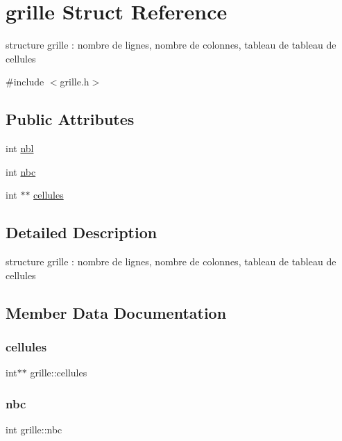 \hypertarget{structgrille}{}\section{grille Struct Reference}
\label{structgrille}


structure grille \+: nombre de lignes, nombre de colonnes, tableau de tableau de cellules  




{\ttfamily \#include $<$grille.\+h$>$}

\subsection*{Public Attributes}
\begin{DoxyCompactItemize}
\item 
int \hyperlink{structgrille_a0b4da1e205825df205b0c004d105d62a}{nbl}
\item 
int \hyperlink{structgrille_a48d6706d41bee6fff9200d872b8b0cd0}{nbc}
\item 
int $\ast$$\ast$ \hyperlink{structgrille_a428cf0c0297ce04e0206ba0067ac3b42}{cellules}
\end{DoxyCompactItemize}


\subsection{Detailed Description}
structure grille \+: nombre de lignes, nombre de colonnes, tableau de tableau de cellules 

\subsection{Member Data Documentation}
\mbox{\label{structgrille_a428cf0c0297ce04e0206ba0067ac3b42}} 
\subsubsection{\texorpdfstring{cellules}{cellules}}
{\footnotesize\ttfamily int$\ast$$\ast$ grille\+::cellules}

\mbox{\label{structgrille_a48d6706d41bee6fff9200d872b8b0cd0}} 
\subsubsection{\texorpdfstring{nbc}{nbc}}
{\footnotesize\ttfamily int grille\+::nbc}

